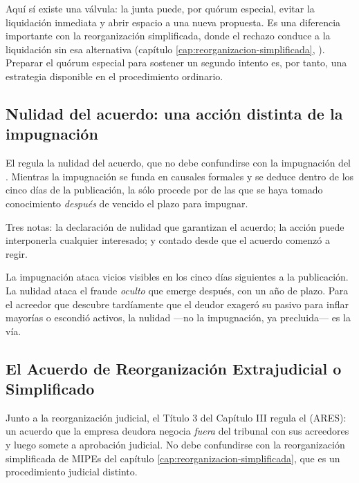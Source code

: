 \begin{alerta}
Aquí sí existe una válvula: la junta puede, por quórum especial, evitar la liquidación inmediata
y abrir espacio a una nueva propuesta. Es una diferencia importante con la reorganización
simplificada, donde el rechazo conduce a la liquidación sin esa alternativa (capítulo
\ref{cap:reorganizacion-simplificada}, ). Preparar el quórum especial para sostener
un segundo intento es, por tanto, una estrategia disponible en el procedimiento ordinario.
\end{alerta}

\subsection{Nulidad del acuerdo: una acción distinta de la impugnación}

El  regula la nulidad del acuerdo, que no debe confundirse con la impugnación del
. Mientras la impugnación se funda en causales formales y se deduce dentro de los cinco
días de la publicación, la  sólo procede por  de las que se haya tomado conocimiento \emph{después} de
vencido el plazo para impugnar.

Tres notas: la declaración de nulidad  que
garantizan el acuerdo; la acción puede interponerla cualquier interesado; y  contado desde que el acuerdo comenzó a regir.

\begin{foco}
La impugnación ataca vicios visibles en los cinco días siguientes a la publicación. La nulidad
ataca el fraude \emph{oculto} que emerge después, con un año de plazo. Para el acreedor que
descubre tardíamente que el deudor exageró su pasivo para inflar mayorías o escondió activos, la
nulidad ---no la impugnación, ya precluida--- es la vía.
\end{foco}

\subsection{El Acuerdo de Reorganización Extrajudicial o Simplificado}

Junto a la reorganización judicial, el Título 3 del Capítulo III regula el  (ARES): un acuerdo que la empresa deudora negocia
\emph{fuera} del tribunal con sus acreedores y luego somete a aprobación judicial. No debe
confundirse con la reorganización simplificada de MIPEs del capítulo
\ref{cap:reorganizacion-simplificada}, que es un procedimiento judicial distinto.


